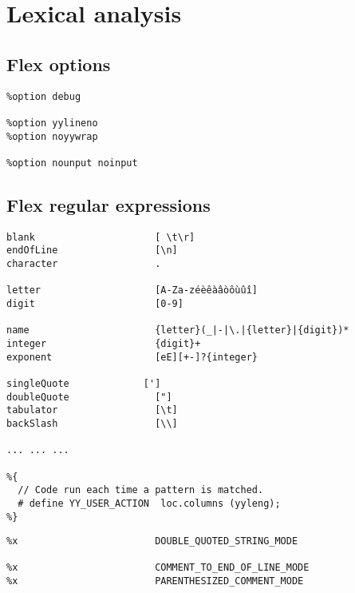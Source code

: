 \section{Lexical analysis}

\subsection{Flex options}

\begin{lstlisting}[language=Flex]
%option interactive
%option debug

%option yylineno
%option noyywrap

%option nounput noinput
\end{lstlisting}


\subsection{Flex regular expressions}

\begin{lstlisting}[language=Flex]
blank                     [ \t\r]
endOfLine                 [\n]
character                 .

letter                    [A-Za-zéèêàâòôùûî]
digit                     [0-9]

name                      {letter}(_|-|\.|{letter}|{digit})*
integer                   {digit}+
exponent                  [eE][+-]?{integer}

singleQuote             [']
doubleQuote               ["]
tabulator                 [\t]
backSlash                 [\\]

... ... ...

%{
  // Code run each time a pattern is matched.
  # define YY_USER_ACTION  loc.columns (yyleng);
%}
\end{lstlisting}


\begin{lstlisting}[language=Flex]
%x                        SINGLE_QUOTED_STRING_MODE
%x                        DOUBLE_QUOTED_STRING_MODE

%x                        COMMENT_TO_END_OF_LINE_MODE
%x                        PARENTHESIZED_COMMENT_MODE
\end{lstlisting}

